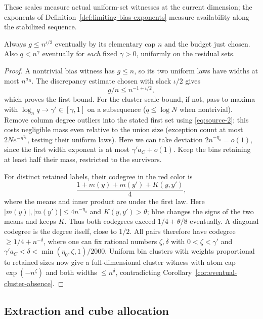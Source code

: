 These scales measure actual uniform-set witnesses at the current dimension;
the exponents of Definition~\ref{def:limiting-bias-exponents} measure
availability along the stabilized sequence.

\begin{lemma}\label{lem:residual-scale-bounds}
Always \(g\le n^{\iota/2}\) eventually by its elementary cap \(n\) and the budget just chosen. Also \(q<n^\gamma\) eventually for \emph{each} fixed \(\gamma>0\), uniformly on the residual sets.
\end{lemma}

\begin{proof}
A nontrivial bias witness has \(g\le n\), so its two uniform laws have widths at most \(n^{a_B}\). The discrepancy estimate chosen with slack \(\iota/2\) gives
\[
 g/n\le n^{-1+\iota/2},
\]
which proves the first bound. For the cluster-scale bound, if not, pass to maxima with \(\log_n q\to\gamma'\in[\gamma,1]\) on a subsequence (\(q\le\log N\) when nontrivial). Remove column degree outliers into the stated first set using \eqref{eq:source-2}; this costs negligible mass even relative to the union size (exception count at most \(2Ne^{-n^{\eta_0}}\), testing their uniform laws). Here we can take deviation \(2n^{-\eta_0}=o(1)\), since the first width exponent is at most \(\gamma' a_C+o(1)\). Keep the bins retaining at least half their mass, restricted to the survivors.

For distinct retained labels, their codegree in the red color is
\[
 \frac{1+m(y)+m(y')+K(y,y')}{4},
\]
where the means and inner product are under the first law. Here \(|m(y)|,|m(y')|\le4n^{-\eta_0}\) and \(K(y,y')>\theta\); blue changes the signs of the two means and keeps \(K\). Thus both codegrees exceed \(1/4+\theta/8\) eventually. A diagonal codegree is the degree itself, close to \(1/2\). All pairs therefore have codegree \(\ge1/4+n^{-\delta}\), where one can fix rational numbers \(\zeta,\delta\) with \(0<\zeta<\gamma'\) and \(\gamma'a_C<\delta<\min(\eta_0,\zeta,1)/2000\). Uniform bin clusters with weights proportional to retained sizes now give a full-dimensional cluster witness with atom cap \(\exp(-n^\zeta)\) and both widths \(\le n^\delta\), contradicting Corollary~\ref{cor:eventual-cluster-absence}.
\end{proof}

\subsection{Extraction and cube allocation}
\label{sec:extraction-and-cube-allocation}

